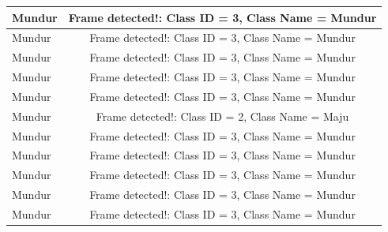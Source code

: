 \begin{longtable}{|l|c|}
  Mundur         & Frame detected!: Class ID = 3, Class Name = Mundur \\ \hline
  Mundur         & Frame detected!: Class ID = 3, Class Name = Mundur \\ \hline
  Mundur         & Frame detected!: Class ID = 3, Class Name = Mundur \\ \hline
  Mundur         & Frame detected!: Class ID = 3, Class Name = Mundur \\ \hline
  Mundur         & Frame detected!: Class ID = 3, Class Name = Mundur \\ \hline
  Mundur         & Frame detected!: Class ID = 2, Class Name = Maju   \\ \hline
  Mundur         & Frame detected!: Class ID = 3, Class Name = Mundur \\ \hline
  Mundur         & Frame detected!: Class ID = 3, Class Name = Mundur \\ \hline
  Mundur         & Frame detected!: Class ID = 3, Class Name = Mundur \\ \hline
  Mundur         & Frame detected!: Class ID = 3, Class Name = Mundur \\ \hline
  Mundur         & Frame detected!: Class ID = 3, Class Name = Mundur \\ \hline
\end{longtable}

